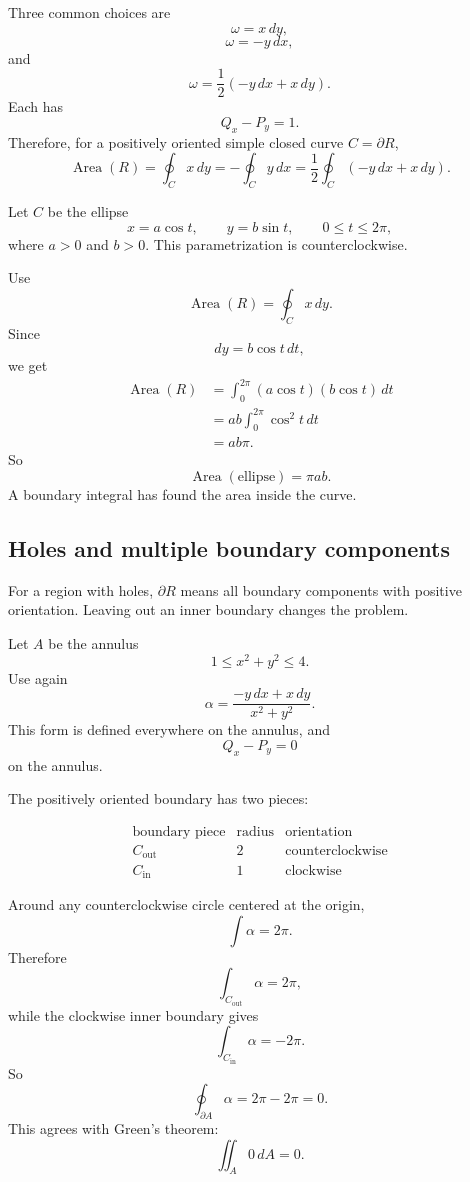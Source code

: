 Three common choices are
\[
    \omega=x\,dy,
\]
\[
    \omega=-y\,dx,
\]
and
\[
    \omega=\frac12(-y\,dx+x\,dy).
\]
Each has
\[
    Q_x-P_y=1.
\]
Therefore, for a positively oriented simple closed curve \(C=\partial R\),
\[
\boxed{
    \operatorname{Area}(R)
    =
    \oint_C x\,dy
    =
    -\oint_C y\,dx
    =
    \frac12\oint_C(-y\,dx+x\,dy).
}
\]

\begin{example}
Let \(C\) be the ellipse
\[
    x=a\cos t,
    \qquad
    y=b\sin t,
    \qquad
    0\le t\le2\pi,
\]
where \(a>0\) and \(b>0\).  This parametrization is counterclockwise.

Use
\[
    \operatorname{Area}(R)=\oint_C x\,dy.
\]
Since
\[
    dy=b\cos t\,dt,
\]
we get
\[
\begin{aligned}
\operatorname{Area}(R)
&=
\int_0^{2\pi}(a\cos t)(b\cos t)\,dt\\
&=ab\int_0^{2\pi}\cos^2t\,dt\\
&=ab\pi.
\end{aligned}
\]
So
\[
\boxed{
    \operatorname{Area}(\text{ellipse})=\pi ab.
}
\]
A boundary integral has found the area inside the curve.
\end{example}

\subsection{Holes and multiple boundary components}

For a region with holes, \(\partial R\) means all boundary components with positive
orientation.  Leaving out an inner boundary changes the problem.

Let \(A\) be the annulus
\[
    1\le x^2+y^2\le4.
\]
Use again
\[
    \alpha=\frac{-y\,dx+x\,dy}{x^2+y^2}.
\]
This form is defined everywhere on the annulus, and
\[
    Q_x-P_y=0
\]
on the annulus.

The positively oriented boundary has two pieces:

\[
\begin{array}{c|c|c}
\text{boundary piece} & \text{radius} & \text{orientation} \\ \hline
C_{\mathrm{out}} & 2 & \text{counterclockwise}\\[1mm]
C_{\mathrm{in}} & 1 & \text{clockwise}
\end{array}
\]

Around any counterclockwise circle centered at the origin,
\[
    \int \alpha=2\pi.
\]
Therefore
\[
    \int_{C_{\mathrm{out}}}\alpha=2\pi,
\]
while the clockwise inner boundary gives
\[
    \int_{C_{\mathrm{in}}}\alpha=-2\pi.
\]
So
\[
\boxed{
    \oint_{\partial A}\alpha=2\pi-2\pi=0.
}
\]
This agrees with Green's theorem:
\[
\boxed{
    \iint_A 0\,dA=0.
}
\]

